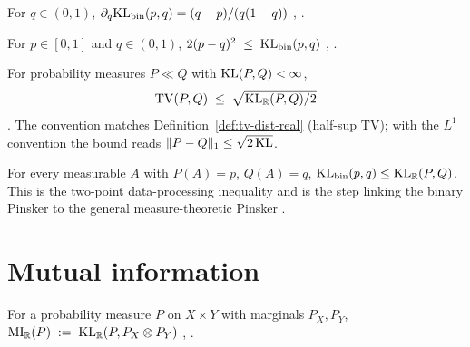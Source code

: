 \begin{lemma}[Derivative in $q$]
\label{lem:deriv-kl-bin}
  \leanok
For $q \in (0, 1)$,
$\partial_q \mathrm{KL}_\mathrm{bin}(p, q) = (q - p) / (q (1 - q))$
\cite[\S2.1, eq.~(2.6)]{polyanskiy-wu}, \cite[\S4.4]{boucheron2013concentration}.
\end{lemma}

\begin{thm}
\label{thm:binary-pinsker}
  \leanok
For $p \in [0, 1]$ and $q \in (0, 1)$,
$2 (p - q)^2 \;\le\; \mathrm{KL}_\mathrm{bin}(p, q)$
\cite{kullback1967}, \cite[Lemma 11.6.1]{cover-thomas}.
\end{thm}

\begin{thm}
\label{thm:pinsker}
  \leanok
For probability measures $P \ll Q$ with $\mathrm{KL}(P,Q) < \infty$,
\[
  \mathrm{TV}(P, Q) \;\le\; \sqrt{\mathrm{KL}_{\mathbb{R}}(P, Q) / 2}
\]
\cite[Thm 11.6.1]{cover-thomas}.
The convention matches
Definition~\ref{def:tv-dist-real} (half-sup TV);
with the $L^1$ convention the bound reads
$\| P - Q \|_1 \le \sqrt{2\,\mathrm{KL}}$.
\end{thm}

\begin{thm}
\label{thm:kl-bin-le-kl}
  \leanok
For every measurable $A$ with $P(A) = p$, $Q(A) = q$,
$\mathrm{KL}_\mathrm{bin}(p, q) \le \mathrm{KL}_{\mathbb{R}}(P, Q)$. This is the two-point
data-processing inequality and is the step linking the binary Pinsker
to the general measure-theoretic Pinsker
\cite[Thm 2.8.1]{cover-thomas}.
\end{thm}

\section{Mutual information}\label{sec:mi}

\begin{defn}
\label{def:mi-real}
  \leanok
For a probability measure $P$ on $X \times Y$ with marginals
$P_X, P_Y$,
$\mathrm{MI}_{\mathbb{R}}(P) \;:=\; \mathrm{KL}_{\mathbb{R}}(P, P_X \otimes P_Y)$
\cite[\S2.3, Defn~2.28]{cover-thomas}, \cite[\S3.1]{polyanskiy-wu}.
\end{defn}

